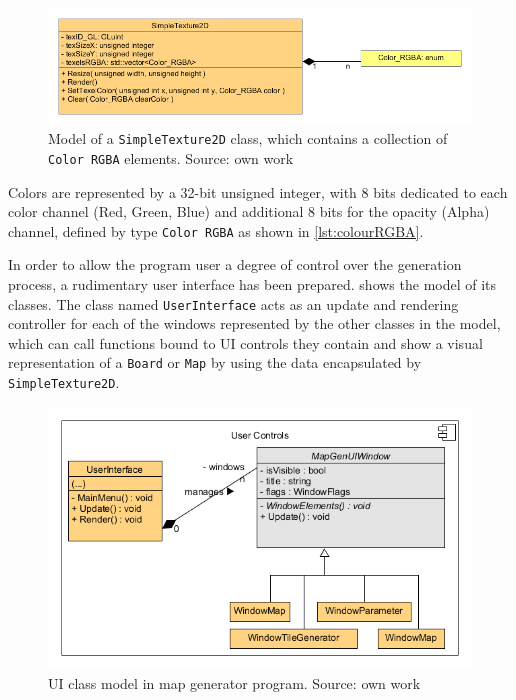 \documentclass[12pt]{report}
\begin{document}
\begin{figure}[H]
	\centering
	\includegraphics[width=0.9\linewidth]{diagrams/texture}
	\caption{Model of a \texttt{SimpleTexture2D} class, which contains a collection of \texttt{Color RGBA} elements. Source: own work}
	\label{fig:texture}
\end{figure}

Colors are represented by a 32-bit unsigned integer, with 8 bits dedicated to each color channel (Red, Green, Blue) and additional 8 bits for the opacity (Alpha) channel, defined by type \texttt{Color RGBA} as shown in \cref{lst:colourRGBA}. 



In order to allow the program user a degree of control over the generation process, a rudimentary user interface has been prepared.  shows the model of its classes. The class named \texttt{UserInterface} acts as an update and rendering controller for each of the windows represented by the other classes in the model, which can call functions bound to UI controls they contain and show a visual representation of a \texttt{Board} or \texttt{Map} by using the data encapsulated by \texttt{SimpleTexture2D}.

\begin{figure}[H]
	\centering
	\includegraphics[width=0.8\linewidth]{diagrams/uiwindows}
	\caption[User Interface model]{UI class model in map generator program. Source: own work}
	\label{fig:uiwindows}
\end{figure}
\end{document}
